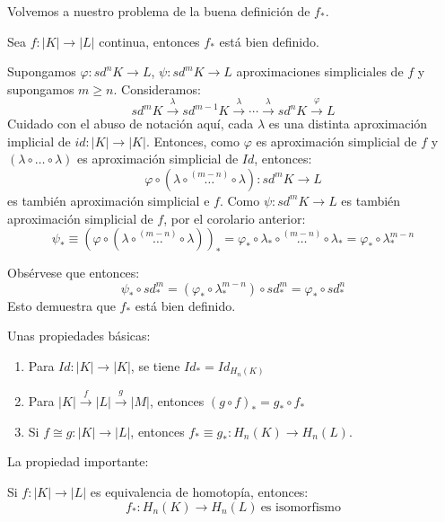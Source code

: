 \documentclass[HS.tex]{subfiles}
\begin{document}
Volvemos a nuestro problema de la buena definición de $f_*$.

\begin{coro}
Sea $f \colon |K| \to |L|$ continua, entonces $f_*$ está bien definido.
\end{coro}
\begin{dem}
Supongamos $\varphi \colon sd^n K \to L$, $\psi \colon sd^m K \to L$ aproximaciones simpliciales de $f$ y supongamos $m \geq n$.
Consideramos:
\[ sd^m K \xrightarrow{\lambda} sd^{m-1} K \xrightarrow{\lambda} \cdots\xrightarrow{\lambda} sd^n K \xrightarrow{\varphi} L \]
Cuidado con el abuso de notación aquí, cada $\lambda$ es una distinta aproximación implicial de $id \colon |K| \to |K|$.
Entonces, como $\varphi$ es aproximación simplicial de $f$ y $(\lambda \circ \dots \circ \lambda)$ es aproximación simplicial de $Id$, entonces:
\[ \varphi \circ (\lambda \circ \overset{(m-n)}{\dots} \circ \lambda) \colon sd^m K \to L\]
es también aproximación simplicial e $f$.
Como $\psi \colon sd^m K \to L$ es también aproximación simplicial de $f$, por el corolario anterior:
\[ \psi_* \equiv (\varphi \circ (\lambda\circ\overset{(m-n)}{\dots} \circ \lambda))_* = \varphi_* \circ \lambda_* \circ \overset{(m-n)}{\dots}\circ \lambda_* = \varphi_* \circ \lambda_*^{m-n}\]

Obsérvese que entonces:
\[ \psi_* \circ sd_*^m = (\varphi_* \circ \lambda_*^{m-n}) \circ sd_*^m =  \varphi_* \circ sd_*^n \]
Esto demuestra que $f_*$ está bien definido.
\end{dem}

Unas propiedades básicas:
\begin{propi}\mbox{}
\begin{enumerate}
	\item Para $Id \colon |K| \to |K|$, se tiene $Id_* = Id_{H_n(K)}$
	\item Para $|K| \xrightarrow{f} |L| \xrightarrow{g} |M|$, entonces $(g \circ f)_* = g_* \circ f_*$
	\item Si $f \cong g\colon |K| \to |L|$, entonces $f_* \equiv g_* \colon H_n(K) \to H_n(L)$.
\end{enumerate}
\end{propi}
La propiedad importante:
\begin{coro}
Si $f \colon |K| \to |L|$ es equivalencia de homotopía, entonces:
\[ f_* \colon H_n(K) \to H_n(L) \ \text{es isomorfismo}\]
\end{coro}
\end{document}

